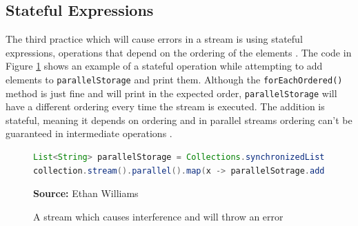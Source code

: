 \documentclass[oneside, 12pt]{article}
\newcommand{\source}[1]{\textbf{Source:} {#1} }
\begin{document}
\subsection{Stateful Expressions} \label{stateful_expressions}
The third practice which will cause errors in a stream  is using stateful expressions, operations that depend on the ordering of the elements \autocite{expression_state}. The code in Figure \ref{fig:stateful} shows an example of a stateful operation while attempting to add elements to \verb|parallelStorage| and print them. Although the \verb|forEachOrdered()| method is just fine and will print in the expected order, \verb|parallelStorage| will have a different ordering every time the stream is executed. The addition is stateful, meaning it depends on ordering and in parallel streams ordering can't be guaranteed in intermediate operations \autocite{parallelism_doc}.

\begin{figure}[H]
\centering
\begin{lstlisting}[language=Java]
List<String> parallelStorage = Collections.synchronizedList(new ArrayList<>());
collection.stream().parallel().map(x -> parallelSotrage.add(x)).forEachOrdered(x -> System.out.println(x));
\end{lstlisting}
\caption{A stream which causes interference and will throw an error}
\source{Ethan Williams}
\label{fig:stateful}
\end{figure}
 
\printbibliography[heading=bibintoc]
\end{document}

